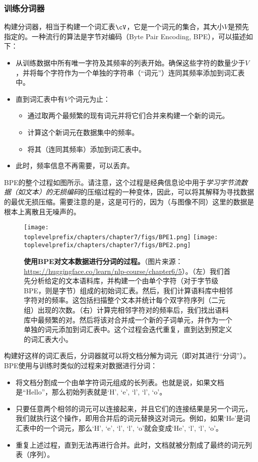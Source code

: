 \documentclass[../../book-main_zh.tex]{subfiles}
\begin{document}
\subsubsection{训练分词器}

构建分词器，相当于构建一个词汇表\(\cV\)，它是一个词元的集合，其大小\(V\)是预先指定的。一种流行的算法是字节对编码（Byte Pair Encoding, BPE），可以描述如下：
\begin{itemize}
    \item 从训练数据中所有唯一字符及其频率的列表开始。确保这些字符的数量少于\(V\)，并将每个字符作为一个单独的字符串（“词元”）连同其频率添加到词汇表中。
    \item 直到词汇表中有\(V\)个词元为止：
    \begin{itemize}
        \item 通过取两个最频繁的现有词元并将它们合并来构建一个新的词元。
        \item 计算这个新词元在数据集中的频率。
        \item 将其（连同其频率）添加到词汇表中。
    \end{itemize} 
    \item 此时，频率信息不再需要，可以丢弃。
\end{itemize}
BPE的整个过程如图所示。请注意，这个过程是经典信息论中用于\textit{学习字节流数据（如文本）的无损编码}的压缩过程的一种变体，因此，可以将其解释为寻找数据的最优无损压缩。需要注意的是，这是可行的，因为（与图像不同）这里的数据是根本上离散且无噪声的。
\begin{figure}
    \centering
    \texttt{[image: \\toplevelprefix/chapters/chapter7/figs/BPE1.png]}\hspace{0.6in} 
    \texttt{[image: \\toplevelprefix/chapters/chapter7/figs/BPE2.png]} 
    \caption{\small {\bf 使用BPE对文本数据进行分词的过程。}（图片来源：\url{https://huggingface.co/learn/nlp-course/chapter6/5}）。（左）我们首先分析给定的文本语料库，并构建一个由单个字符（对于字节级BPE，则是字节）组成的初始词汇表。然后，我们计算语料库中相邻字符对的频率。这包括扫描整个文本并统计每个双字符序列（二元组）出现的次数。（右）计算完相邻字符对的频率后，我们找出语料库中最频繁的对。然后将该对合并成一个新的子词单元，并作为一个单独的词元添加到词汇表中。这个过程会迭代重复，直到达到预定义的词汇表大小。 }
    \label{fig:BPE}
\end{figure}
构建好这样的词汇表后，分词器就可以将文档分解为词元（即对其进行“分词”）。BPE使用与训练时类似的过程来对数据进行分词：
\begin{itemize}
    \item 将文档分割成一个由单字符词元组成的长列表。也就是说，如果文档是“Hello”，那么初始列表就是`H', `e', `l', `l', `o'。
    \item 只要任意两个相邻的词元可以连接起来，并且它们的连接结果是另一个词元，我们就执行这个操作，即用合并后的词元替换这对词元。例如，如果`He'是词汇表中的一个词元，那么`H', `e', `l', `l', `o'就会变成`He', `l', `l', `o'。
    \item 重复上述过程，直到无法再进行合并。此时，文档就被分割成了最终的词元列表（序列）。
\end{itemize}
\end{document}
